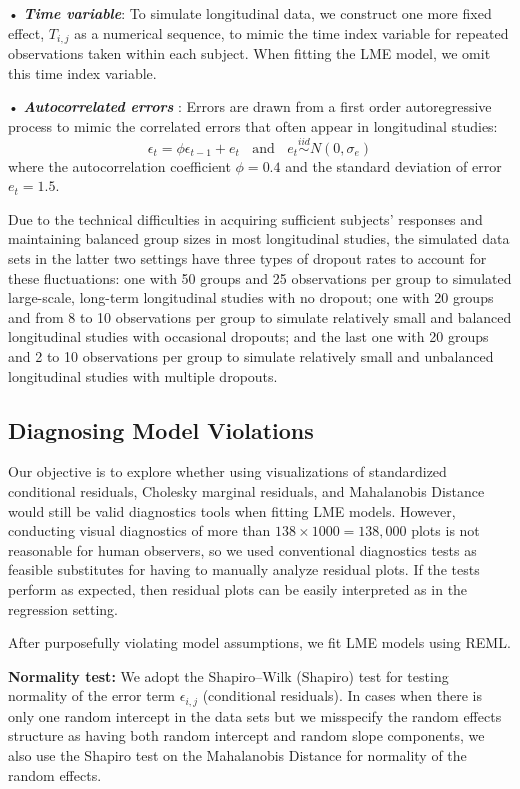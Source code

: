 \documentclass[12pt]{article}
\begin{document}
• \textbf{\emph{Time variable}}: To simulate longitudinal data, we
construct one more fixed effect, \(T_{i,j}\) as a numerical sequence, to
mimic the time index variable for repeated observations taken within
each subject. When fitting the LME model, we omit this time index
variable.

• \textbf{\emph{Autocorrelated errors }}: Errors are drawn from a first
order autoregressive process to mimic the correlated errors that often
appear in longitudinal studies: \begin{equation} 
\epsilon_{t} =  \phi \epsilon_{t-1} + e_t\ \ \ \  \text{and} \ \ \ \ e_t \overset{iid}\sim N(0, \sigma_e) \end{equation}
where the autocorrelation coefficient \(\phi=0.4\) and the standard
deviation of error \(e_t = 1.5\).

Due to the technical difficulties in acquiring sufficient subjects'
responses and maintaining balanced group sizes in most longitudinal
studies, the simulated data sets in the latter two settings have three
types of dropout rates to account for these fluctuations: one with 50
groups and 25 observations per group to simulated large-scale, long-term
longitudinal studies with no dropout; one with 20 groups and from 8 to
10 observations per group to simulate relatively small and balanced
longitudinal studies with occasional dropouts; and the last one with 20
groups and 2 to 10 observations per group to simulate relatively small
and unbalanced longitudinal studies with multiple dropouts.

\subsection{Diagnosing Model Violations}

Our objective is to explore whether using visualizations of standardized
conditional residuals, Cholesky marginal residuals, and Mahalanobis
Distance would still be valid diagnostics tools when fitting LME models.
However, conducting visual diagnostics of more than
\(138 \times 1000 = 138,000\) plots is not reasonable for human
observers, so we used conventional diagnostics tests as feasible
substitutes for having to manually analyze residual plots. If the tests
perform as expected, then residual plots can be easily interpreted as in
the regression setting.

After purposefully violating model assumptions, we fit LME models using
REML.

\textbf{Normality test:} We adopt the Shapiro--Wilk (Shapiro) test for
testing normality of the error term \(\epsilon_{i,j}\) (conditional
residuals). In cases when there is only one random intercept in the data
sets but we misspecify the random effects structure as having both
random intercept and random slope components, we also use the Shapiro
test on the Mahalanobis Distance for normality of the random effects.
\end{document}
